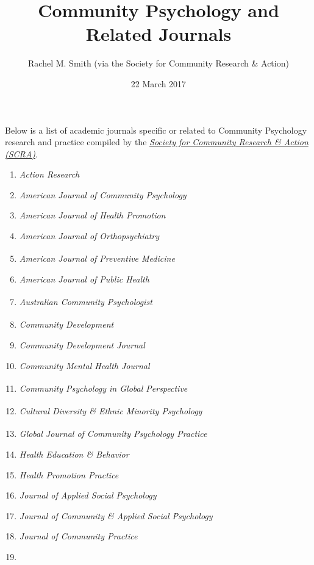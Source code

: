 \documentclass[]{tufte-handout}
\title{Community Psychology and Related Journals}
\author{Rachel M. Smith (via the Society for Community Research \& Action)}
\date{22 March 2017}
\providecommand{\tightlist}{%
  \setlength{\itemsep}{0pt}\setlength{\parskip}{0pt}}
\begin{document}
\maketitle




Below is a list of academic journals specific or related to Community
Psychology research and practice compiled by the
\href{http://www.scra27.org}{\emph{Society for Community Research \&
Action (SCRA)}}.\\

\begin{enumerate}
\def\labelenumi{\arabic{enumi}.}
\tightlist
\item
  \emph{Action Research}
\item
  \emph{American Journal of Community Psychology}
\item
  \emph{American Journal of Health Promotion}
\item
  \emph{American Journal of Orthopsychiatry}
\item
  \emph{American Journal of Preventive
  Medicine\textsuperscript{\textdagger}}
\item
  \emph{American Journal of Public Health}
\item
  \emph{Australian Community Psychologist\textsuperscript{\textdagger}}
\item
  \emph{Community Development\textsuperscript{\textdagger}}
\item
  \emph{Community Development Journal}
\item
  \emph{Community Mental Health Journal}
\item
  \emph{Community Psychology in Global
  Perspective\textsuperscript{\textdagger}}
\item
  \emph{Cultural Diversity \& Ethnic Minority
  Psychology\textsuperscript{\textdagger}}
\item
  \emph{Global Journal of Community Psychology
  Practice\textsuperscript{\textdagger}}
\item
  \emph{Health Education \& Behavior}
\item
  \emph{Health Promotion Practice}
\item
  \emph{Journal of Applied Social Psychology}
\item
  \emph{Journal of Community \& Applied Social Psychology}
\item
  \emph{Journal of Community Practice}
\item

\end{enumerate}
\end{document}
